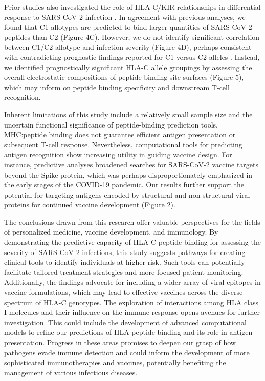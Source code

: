 \documentclass[utf8]{frontiersinFPHY_FAMS} %
\begin{document}
Prior studies also investigated the role of HLA-C/KIR relationships in differential response to SARS-CoV-2 infection \citep{34352002, 35874712, 33233780}. In agreement with previous analyses, we found that C1 allotypes are predicted to bind larger quantities of SARS-CoV-2 peptides than C2 \citep{32810602} (Figure 4C).  However, we do not identify significant correlation between C1/C2 allotype and infection severity (Figure 4D), perhaps consistent with contradicting prognostic findings reported for C1 versus C2 alleles \citep{32988645, 32717807, 32717807, 35960731, 34490415, 33343579, 34289534, 34722002, 33298875, 32988645, 35960731, 35681490, 33905752}.  Instead, we identified prognostically significant HLA-C allele groupings by assessing the overall electrostatic compositions of peptide binding site surfaces (Figure 5), which may inform on peptide binding specificity and downstream T-cell recognition. 

Inherent limitations of this study include a relatively small sample size and the uncertain functional significance of peptide-binding prediction tools. MHC:peptide binding does not guarantee efficient antigen presentation or subsequent T-cell response. Nevertheless, computational tools for predicting antigen recognition show increasing utility in guiding vaccine design. For instance, predictive analyses broadened searches for SARS-CoV-2 vaccine targets beyond the Spike protein, which was perhaps disproportionately emphasized in the early stages of the COVID-19 pandemic. Our results further support the potential for targeting antigens encoded by structural and non-structural viral proteins for continued vaccine development (Figure 2).

The conclusions drawn from this research offer valuable perspectives for the fields of personalized medicine, vaccine development, and immunology. By demonstrating the predictive capacity of HLA-C peptide binding for assessing the severity of SARS-CoV-2 infections, this study suggests pathways for creating clinical tools to identify individuals at higher risk. Such tools can potentially facilitate tailored treatment strategies and more focused patient monitoring. Additionally, the findings advocate for including a wider array of viral epitopes in vaccine formulations, which may lead to effective vaccines across the diverse spectrum of HLA-C genotypes. The exploration of interactions among HLA class I molecules and their influence on the immune response opens avenues for further investigation. This could include the development of advanced computational models to refine our predictions of HLA-peptide binding and its role in antigen presentation. Progress in these areas promises to deepen our grasp of how pathogens evade immune detection and could inform the development of more sophisticated immunotherapies and vaccines, potentially benefiting the management of various infectious diseases. 
\end{document}
